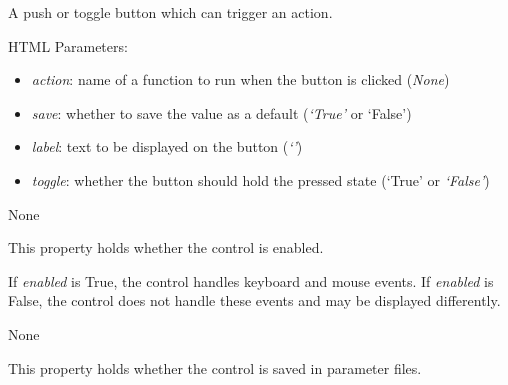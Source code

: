 \documentclass[letterpaper,10pt,english]{sphinxmanual}
\begin{document}
\begin{fulllineitems}
\label{api:controls.Button}
A push or toggle button which can trigger an action.

HTML Parameters:
\begin{itemize}
\item {} 
\emph{action}: name of a function to run when the button is clicked (\emph{None})

\item {} 
\emph{save}: whether to save the value as a default (\emph{`True'} or `False')

\item {} 
\emph{label}: text to be displayed on the button (\emph{`'})

\item {} 
\emph{toggle}: whether the button should hold the pressed state (`True' or
\emph{`False'})

\end{itemize}

\begin{fulllineitems}
\label{api:controls.Button.action}
None

\end{fulllineitems}


\begin{fulllineitems}
\label{api:controls.Button.enabled}
This property holds whether the control is enabled.

If \emph{enabled} is True, the control handles keyboard and mouse events.
If \emph{enabled} is False, the control does not handle these events and may
be displayed differently.

\end{fulllineitems}


\begin{fulllineitems}
\label{api:controls.Button.label}
None

\end{fulllineitems}


\begin{fulllineitems}
\label{api:controls.Button.save}
This property holds whether the control is saved in parameter files.


\end{fulllineitems}
\end{fulllineitems}
\end{document}

